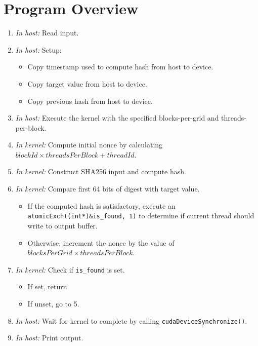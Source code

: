 \documentclass[a4paper,12pt]{article}
\begin{document}
\section{Program Overview}
\begin{enumerate}
  \item \textit{In host:} Read input.
  \item \textit{In host:} Setup:
  \begin{itemize}
    \item Copy timestamp used to compute hash from host to device.
    \item Copy target value from host to device.
    \item Copy previous hash from host to device.
  \end{itemize}
  \item \textit{In host:} Execute the kernel with the specified blocks-per-grid and threads-per-block.
  \item \textit{In kernel:} Compute initial nonce by calculating $blockId \times threadsPerBlock + threadId$.
  \item \textit{In kernel:} Construct SHA256 input and compute hash.
  \item \textit{In kernel:} Compare first 64 bits of digest with target value.
  \begin{itemize}
    \item If the computed hash is satisfactory, execute an \texttt{atomicExch((int*)&is_found, 1)} to determine if current thread should write to output buffer.
    \item Otherwise, increment the nonce by the value of $blocksPerGrid \times threadsPerBlock$.
  \end{itemize}
  \item \textit{In kernel:} Check if \texttt{is_found} is set.
  \begin{itemize}
    \item If set, return.
    \item If unset, go to 5.
  \end{itemize}
  \item \textit{In host:} Wait for kernel to complete by calling \texttt{cudaDeviceSynchronize()}.
  \item \textit{In host:} Print output.


\end{enumerate}
\end{document}
